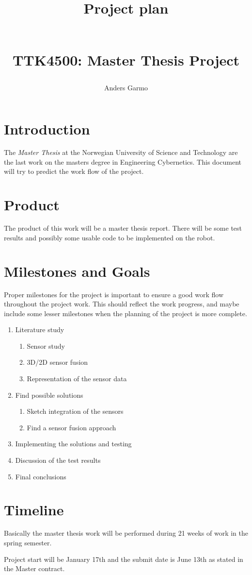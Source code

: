 \documentclass[a4paper, 10pt]{article}
\title{\begin{huge}\textbf{Project plan}\end{huge} \\ TTK4500: Master Thesis Project }
\author{Anders Garmo}
\begin{document}
\maketitle

\newpage


\section{Introduction}
The \emph{Master Thesis} at the Norwegian University of Science and Technology are the
last work on the masters degree in Engineering Cybernetics. This document will try to
predict the work flow of the project. 

\section{Product}
The product of this work will be a master thesis report. There will be some test results
and possibly some usable code to be implemented on the robot.

\section{Milestones and Goals}
Proper milestones for the project is important to ensure a good work flow throughout the
project work. This should reflect the work progress, and maybe include some lesser
milestones when the planning of the project is more complete.

\begin{enumerate}
    \item Literature study
        \begin{enumerate}
            \item Sensor study
            \item 3D/2D sensor fusion
            \item Representation of the sensor data
        \end{enumerate}
    \item Find possible solutions
        \begin{enumerate}
            \item Sketch integration of the sensors
            \item Find a sensor fusion approach
        \end{enumerate}
    \item Implementing the solutions and testing
    \item Discussion of the test results
    \item Final conclusions
\end{enumerate}


\section{Timeline}
Basically the master thesis work will be performed during 21 weeks of work in the spring
semester. 

Project start will be January 17th and the submit date is June 13th as stated in the
Master contract. 
\end{document}
